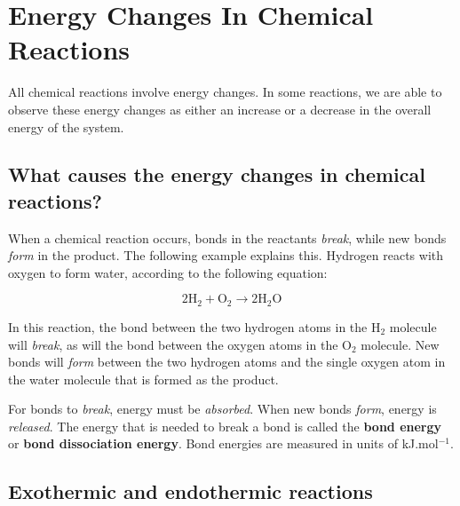 \chapter{Energy Changes In Chemical Reactions}
\label{chap:energychanges}

All chemical reactions involve energy changes. In some reactions, we are able to observe these energy changes as either an increase or a decrease in the overall energy of the system.



\section{What causes the energy changes in chemical reactions?}

When a chemical reaction occurs, bonds in the reactants \textit{break}, while new bonds \textit{form} in the product. The following example explains this.
Hydrogen reacts with oxygen to form water, according to the following equation:

\begin{equation*}
2\text{H}_{2} + \text{O}_{2} \rightarrow 2\text{H}_{2}\text{O}
\end{equation*}

In this reaction, the bond between the two hydrogen atoms in the H$_{2}$ molecule will \textit{break}, as will the bond between the oxygen atoms in the O$_{2}$ molecule. New bonds will \textit{form} between the two hydrogen atoms and the single oxygen atom in the water molecule that is formed as the product.

For bonds to \textit{break}, energy must be \textit{absorbed}. When new bonds \textit{form}, energy is \textit{released}. The energy that is needed to break a bond is called the \textbf{bond energy} or \textbf{bond dissociation energy}. Bond energies are measured in units of kJ.mol$^{-1}$.








\section{Exothermic and endothermic reactions}
\label{sec:energychanges:exoendo}

